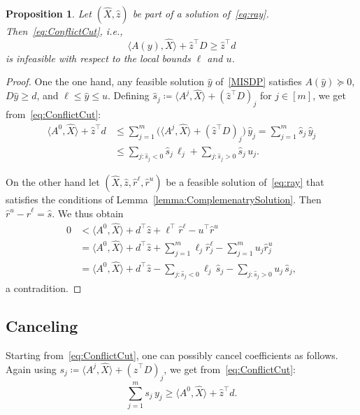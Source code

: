 \documentclass[10pt, a4paper]{article}
\newcommand{\define}{\coloneqq}
\newcommand{\skal}[2]{\langle{#1},{#2}\rangle}
\newcommand{\T}{^{\top}}
\newtheorem{proposition}[theorem]{Proposition}
\begin{document}
\begin{proposition}
  Let $(\hat{X}, \hat{z})$ be part of a solution of~\eqref{eq:ray}. Then~\eqref{eq:ConflictCut}, i.e.,
  \[
    \skal{A(y)}{\hat{X}} + \hat{z}\T D \geq \hat{z}\T d
  \]
  is infeasible with respect to the local bounds $\ell$ and $u$.
\end{proposition}

\begin{proof}
  One the one hand, any feasible solution $\hat{y}$ of~\eqref{MISDP} satisfies
  $A(\hat{y}) \succeq 0$, $D \hat{y} \geq d$, and
  $\ell \leq \hat{y} \leq u$. Defining
  $\hat{s}_j \define \skal{A^j}{\hat{X}} + (\hat{z}\T D)_j$ for
  $j \in [m]$, we get from~\eqref{eq:ConflictCut}:
  \begin{align*}
    \skal{A^0}{\hat{X}} + \hat{z}\T d & \leq \sum_{j=1}^m \big(\skal{A^j}{\hat{X}} + (\hat{z}\T D)_j\big)\, \hat{y}_j
    = \sum_{j=1}^m \hat{s}_j\, \hat{y}_j\\
    & \leq \sum_{j: \hat{s}_j < 0} \hat{s}_j\, \ell_j +
        \sum_{j: \hat{s}_j > 0} \hat{s}_j\, u_j.
  \end{align*}

  On the other hand let $(\hat{X}, \hat{z}, \hat{r}^\ell, \hat{r}^u)$ be a
  feasible solution of~\eqref{eq:ray} that satisfies the conditions of
  Lemma~\ref{lemma:ComplemenatrySolution}. Then
  $\hat{r}^u - \hat{r}^\ell = \hat{s}$.  We thus obtain
  \begin{align*}
    0 & < \skal{A^0}{\hat{X}} + d\T \hat{z} + \ell\T \hat{r}^\ell - u\T \hat{r}^u\\
      & = \skal{A^0}{\hat{X}} + d\T \hat{z} + \sum_{j=1}^m \ell_j \hat{r}^\ell_j -
        \sum_{j=1}^m u_j \hat{r}^u_j\\
      & = \skal{A^0}{\hat{X}}  + d\T \hat{z} - \sum_{j: \hat{s}_j < 0} \ell_j\, \hat{s}_j -
        \sum_{j: \hat{s}_j > 0} u_j\, \hat{s}_j,
  \end{align*}
  a contradition.
\end{proof}

\subsection{Canceling}
\label{sec:Canceling}

Starting from~\eqref{eq:ConflictCut}, one can possibly cancel coefficients
as follows. Again using
$s_j \define \skal{A^j}{\hat{X}} + (\hat{z}\T D)_j$, we get
from~\eqref{eq:ConflictCut}:
\begin{equation}\label{eq:ConflictCut3}
  \sum_{j=1}^m s_j\, y_j \geq \skal{A^0}{\hat{X}} + \hat{z}\T d.
\end{equation}
\end{document}
